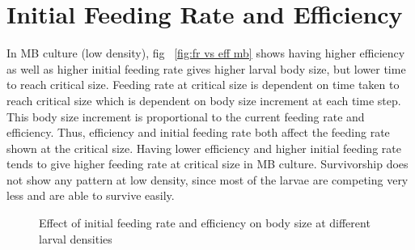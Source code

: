 \section{Initial Feeding Rate and Efficiency}
In MB culture (low density), fig ~\ref{fig:fr vs eff mb} shows having higher efficiency as well as higher initial feeding rate gives higher larval body size, but lower time to reach critical size. Feeding rate at critical size is dependent on time taken to reach critical size which is dependent on body size increment at each time step. This body size increment is proportional to the current feeding rate and efficiency. Thus, efficiency and initial feeding rate both affect the feeding rate shown at the critical size. Having lower efficiency and higher initial feeding rate tends to give higher feeding rate at critical size in MB culture. Survivorship does not show any pattern at low density, since most of the larvae are competing very less and are able to survive easily. \\
\begin{figure}[h]
\caption{Effect of initial feeding rate and efficiency on body size at different larval densities}
\label{fig:fr_eff_bs}
\end{figure}

